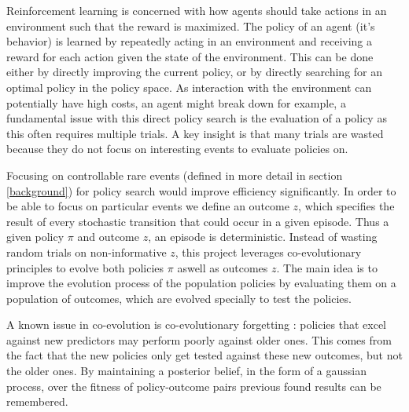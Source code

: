 Reinforcement learning is concerned with how agents should take actions in an environment such that the reward is maximized. The policy of an agent (it's behavior) is learned by repeatedly acting in an environment and receiving a reward for each action given the state of the environment. This can be done either by directly improving the current policy, or by directly searching for an optimal policy in the policy space. As interaction with the environment can potentially have high costs, an agent might break down for example, a fundamental issue with this direct policy search is the evaluation of a policy as this often requires multiple trials. A key insight is that many trials are wasted because they do not focus on interesting events to evaluate policies on. 


Focusing on controllable rare events (defined in more detail in section \ref{background}) for policy search would improve efficiency significantly. In order to be able to focus on particular events we define an outcome $z$, which specifies the result of every stochastic transition that could occur in a given episode. Thus a given policy $\pi$ and outcome $z$, an episode is deterministic. Instead of wasting random trials on non-informative $z$, this project leverages co-evolutionary principles to evolve both policies $\pi$ aswell as outcomes $z$. The main idea is to improve the evolution process of the population policies by evaluating them on a population of outcomes, which are evolved specially to test the policies.

A known issue in co-evolution is co-evolutionary forgetting \cite{forgetting}: policies that excel against new predictors may perform poorly against older ones. This comes from the fact that the new policies only get tested against these new outcomes, but not the older ones. By maintaining a posterior belief, in the form of a gaussian process, over the fitness of policy-outcome pairs previous found results can be remembered. 


